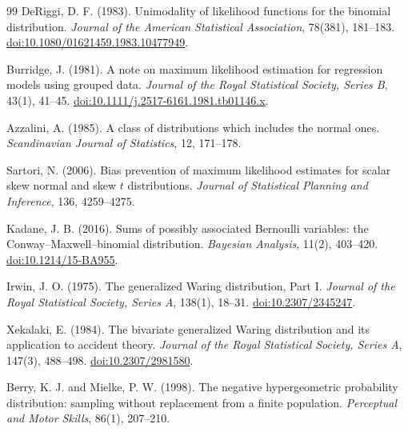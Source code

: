 \documentclass[11pt]{article}
\theoremstyle{plain}
\theoremstyle{definition}
\theoremstyle{remark}
\begin{document}
\begin{thebibliography}{99}
 DeRiggi, D. F. (1983). Unimodality of likelihood
functions for the binomial distribution. \emph{Journal of the American
Statistical Association}, 78(381), 181--183.
\href{https://doi.org/10.1080/01621459.1983.10477949}{doi:10.1080/01621459.1983.10477949}.

 Burridge, J. (1981). A note on maximum likelihood
estimation for regression models using grouped data. \emph{Journal of the
Royal Statistical Society, Series B}, 43(1), 41--45.
\href{https://doi.org/10.1111/j.2517-6161.1981.tb01146.x}{doi:10.1111/j.2517-6161.1981.tb01146.x}.

 Azzalini, A. (1985). A class of distributions which
includes the normal ones. \emph{Scandinavian Journal of Statistics}, 12,
171--178.

 Sartori, N. (2006). Bias prevention of maximum
likelihood estimates for scalar skew normal and skew $t$ distributions.
\emph{Journal of Statistical Planning and Inference}, 136, 4259--4275.

 Kadane, J. B. (2016). Sums of possibly associated
Bernoulli variables: the Conway--Maxwell--binomial distribution.
\emph{Bayesian Analysis}, 11(2), 403--420.
\href{https://doi.org/10.1214/15-BA955}{doi:10.1214/15-BA955}.

 Irwin, J. O. (1975). The generalized Waring
distribution, Part I. \emph{Journal of the Royal Statistical Society,
Series A}, 138(1), 18--31.
\href{https://doi.org/10.2307/2345247}{doi:10.2307/2345247}.

 Xekalaki, E. (1984). The bivariate generalized
Waring distribution and its application to accident theory. \emph{Journal
of the Royal Statistical Society, Series A}, 147(3), 488--498.
\href{https://doi.org/10.2307/2981580}{doi:10.2307/2981580}.

 Berry, K. J. and Mielke, P. W. (1998). The
negative hypergeometric probability distribution: sampling without
replacement from a finite population. \emph{Perceptual and Motor Skills},
86(1), 207--210.

\end{thebibliography}
\end{document}
